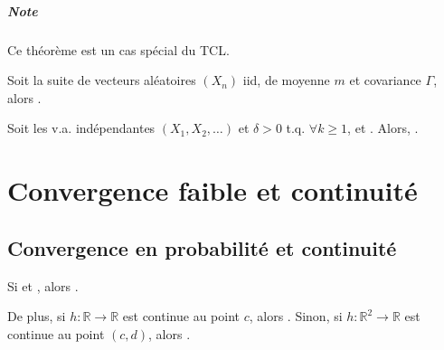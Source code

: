 \documentclass[10pt, french]{report}
\begin{document}
\begin{multicols*}{2}
\begin{definitionNOHFILLsub}
\paragraph{Note}	Ce théorème est un cas spécial du TCL.
\end{definitionNOHFILLsub}

\begin{definitionNOHFILL}
Soit la suite de vecteurs aléatoires $(X_{n})$ iid, de moyenne $m$ et covariance $\Gamma$, alors .
\end{definitionNOHFILL}

\begin{definitionNOHFILL}
Soit les v.a. indépendantes $(X_{1}, X_{2}, \dots)$ et $\delta > 0$ t.q. $\forall k \geq 1$, et . Alors, .
\end{definitionNOHFILL}




\newpage
\chapter{Convergence faible et continuité}
\section{Convergence en probabilité et continuité}
\begin{definitionNOHFILL}[Proposition]
Si  et , alors .

\bigskip

De plus, si $h: \mathbb{R} \rightarrow \mathbb{R}$ est continue au point $c$, alors . Sinon, si $h: \mathbb{R}^{2} \rightarrow \mathbb{R}$ est continue au point $(c, d)$, alors .


\end{definitionNOHFILL}
\end{multicols*}
\end{document}
